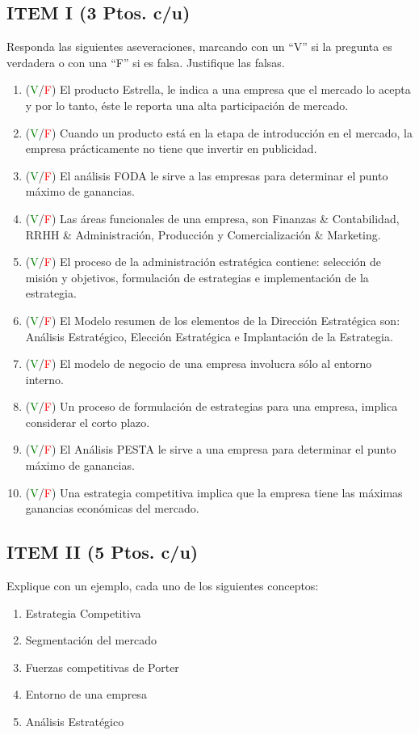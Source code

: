 \documentclass{templateNote}
\begin{document}
\subsection*{ITEM I (3 Ptos. c/u)}
Responda las siguientes aseveraciones, marcando con un “V” si la pregunta es verdadera o con una “F” si es falsa. Justifique las falsas.   
\begin{enumerate}
    \item (\textcolor{green}{V}/\textcolor{red}{F}) El producto Estrella, le indica a una empresa que el mercado lo acepta y por lo tanto, éste le reporta una alta participación de mercado.
    \item (\textcolor{green}{V}/\textcolor{red}{F}) Cuando un producto está en la etapa de introducción en el mercado, la empresa prácticamente no tiene que invertir en publicidad.
    \item (\textcolor{green}{V}/\textcolor{red}{F}) El análisis FODA le sirve a las empresas para determinar el punto máximo de ganancias.
    \item (\textcolor{green}{V}/\textcolor{red}{F}) Las áreas funcionales de una empresa, son Finanzas \& Contabilidad, RRHH \& Administración, Producción y Comercialización \& Marketing.
    \item (\textcolor{green}{V}/\textcolor{red}{F}) El proceso de la administración estratégica contiene: selección de misión y objetivos, formulación de estrategias e implementación de la estrategia.
    \item (\textcolor{green}{V}/\textcolor{red}{F}) El Modelo resumen de los elementos de la Dirección Estratégica son: Análisis Estratégico, Elección Estratégica e Implantación de la Estrategia.
    \item (\textcolor{green}{V}/\textcolor{red}{F}) El modelo de negocio de una empresa involucra sólo al entorno interno.
    \item (\textcolor{green}{V}/\textcolor{red}{F}) Un proceso de formulación de estrategias para una empresa, implica considerar el corto plazo.
    \item (\textcolor{green}{V}/\textcolor{red}{F}) El Análisis PESTA le sirve a una empresa para determinar el punto máximo de ganancias.
    \item (\textcolor{green}{V}/\textcolor{red}{F}) Una estrategia competitiva implica que la empresa tiene las máximas ganancias económicas del mercado.
\end{enumerate}

\newpage
\subsection*{ITEM II (5 Ptos. c/u)}
Explique con un ejemplo, cada uno de los siguientes conceptos:
\begin{enumerate}
    \item Estrategia Competitiva
    \item Segmentación del mercado
    \item Fuerzas competitivas de Porter
    \item Entorno de una empresa
    \item Análisis Estratégico
\end{enumerate}
\end{document}
